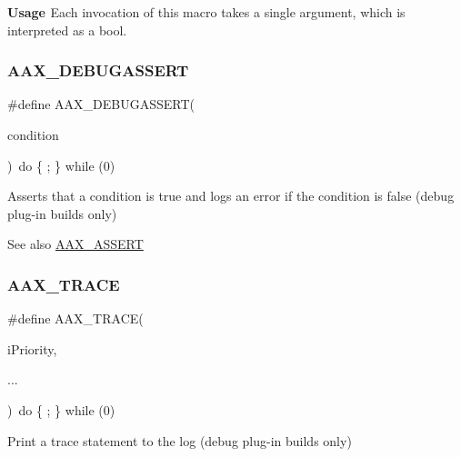 {\bfseries{Usage }} Each invocation of this macro takes a single argument, which is interpreted as a {\ttfamily bool}.


\begin{DoxyCode}{0}
\end{DoxyCode}
 \mbox{\label{a00395_aa0253bd2994036fcfd6629ecf465d543}} 
\subsubsection{\texorpdfstring{AAX\_DEBUGASSERT}{AAX\_DEBUGASSERT}}
{\footnotesize\ttfamily \#define A\+A\+X\+\_\+\+D\+E\+B\+U\+G\+A\+S\+S\+E\+RT(\begin{DoxyParamCaption}\item[{}]{condition }\end{DoxyParamCaption})~do \{ ; \} while (0)}



Asserts that a condition is true and logs an error if the condition is false (debug plug-\/in builds only) 

\begin{DoxySeeAlso}{See also}
\mbox{\hyperlink{a00395_a168ee44fd7a5485ab50160db36fb2988}{A\+A\+X\+\_\+\+A\+S\+S\+E\+RT}} 
\end{DoxySeeAlso}
\mbox{\label{a00395_ab53f1d6a94f8b6ebb3a101f71bfe4e82}} 
\subsubsection{\texorpdfstring{AAX\_TRACE}{AAX\_TRACE}}
{\footnotesize\ttfamily \#define A\+A\+X\+\_\+\+T\+R\+A\+CE(\begin{DoxyParamCaption}\item[{}]{i\+Priority,  }\item[{}]{... }\end{DoxyParamCaption})~do \{ ; \} while (0)}



Print a trace statement to the log (debug plug-\/in builds only) 

